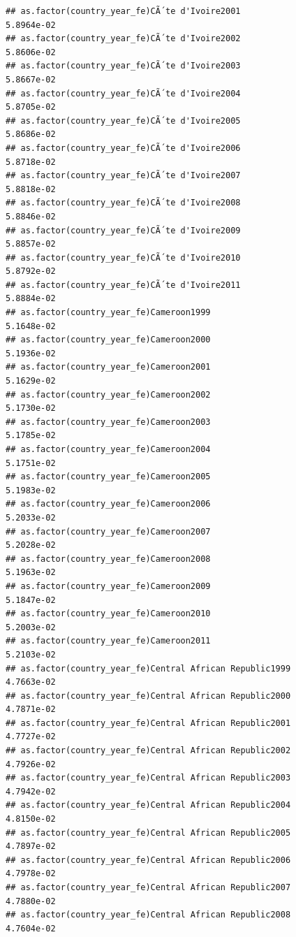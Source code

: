 \documentclass[
  a4paper,
]{article}
\begin{document}
\begin{verbatim}
## as.factor(country_year_fe)CÃ´te d'Ivoire2001                    5.8964e-02
## as.factor(country_year_fe)CÃ´te d'Ivoire2002                    5.8606e-02
## as.factor(country_year_fe)CÃ´te d'Ivoire2003                    5.8667e-02
## as.factor(country_year_fe)CÃ´te d'Ivoire2004                    5.8705e-02
## as.factor(country_year_fe)CÃ´te d'Ivoire2005                    5.8686e-02
## as.factor(country_year_fe)CÃ´te d'Ivoire2006                    5.8718e-02
## as.factor(country_year_fe)CÃ´te d'Ivoire2007                    5.8818e-02
## as.factor(country_year_fe)CÃ´te d'Ivoire2008                    5.8846e-02
## as.factor(country_year_fe)CÃ´te d'Ivoire2009                    5.8857e-02
## as.factor(country_year_fe)CÃ´te d'Ivoire2010                    5.8792e-02
## as.factor(country_year_fe)CÃ´te d'Ivoire2011                    5.8884e-02
## as.factor(country_year_fe)Cameroon1999                          5.1648e-02
## as.factor(country_year_fe)Cameroon2000                          5.1936e-02
## as.factor(country_year_fe)Cameroon2001                          5.1629e-02
## as.factor(country_year_fe)Cameroon2002                          5.1730e-02
## as.factor(country_year_fe)Cameroon2003                          5.1785e-02
## as.factor(country_year_fe)Cameroon2004                          5.1751e-02
## as.factor(country_year_fe)Cameroon2005                          5.1983e-02
## as.factor(country_year_fe)Cameroon2006                          5.2033e-02
## as.factor(country_year_fe)Cameroon2007                          5.2028e-02
## as.factor(country_year_fe)Cameroon2008                          5.1963e-02
## as.factor(country_year_fe)Cameroon2009                          5.1847e-02
## as.factor(country_year_fe)Cameroon2010                          5.2003e-02
## as.factor(country_year_fe)Cameroon2011                          5.2103e-02
## as.factor(country_year_fe)Central African Republic1999          4.7663e-02
## as.factor(country_year_fe)Central African Republic2000          4.7871e-02
## as.factor(country_year_fe)Central African Republic2001          4.7727e-02
## as.factor(country_year_fe)Central African Republic2002          4.7926e-02
## as.factor(country_year_fe)Central African Republic2003          4.7942e-02
## as.factor(country_year_fe)Central African Republic2004          4.8150e-02
## as.factor(country_year_fe)Central African Republic2005          4.7897e-02
## as.factor(country_year_fe)Central African Republic2006          4.7978e-02
## as.factor(country_year_fe)Central African Republic2007          4.7880e-02
## as.factor(country_year_fe)Central African Republic2008          4.7604e-02

\end{verbatim}
\end{document}
